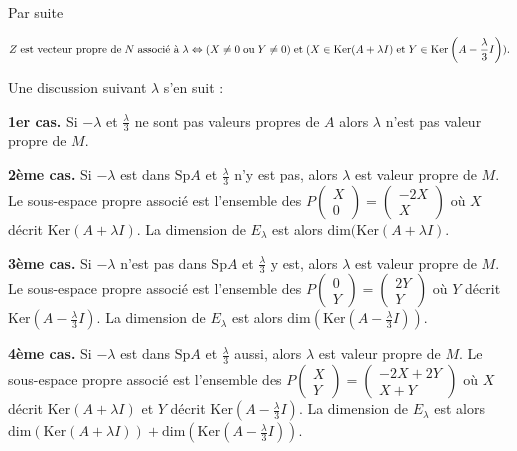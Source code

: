 {{Par suite

\begin{align*}\ensuremath
Z\;\text{est vecteur propre de}\;N\;\text{associé à}\;\lambda\Leftrightarrow(X\neq0\;\text{ou}\;Y\neq0)\;\text{et}\; 
(X\in\text{Ker}(A+\lambda I)\;\text{et}\;Y\in\text{Ker}\left(A-\frac{\lambda}{3}I\right)).
\end{align*}

Une discussion suivant $\lambda$ s'en suit :

\textbf{1er cas.} Si $-\lambda$ et $\frac{\lambda}{3}$ ne sont pas valeurs propres de $A$ alors $\lambda$ n'est pas valeur propre de $M$.

\textbf{2ème cas.} Si $-\lambda$ est dans $\text{Sp}A$ et $\frac{\lambda}{3}$ n'y est pas, alors $\lambda$ est valeur propre de $M$.
Le sous-espace propre associé est l'ensemble des $P\left(
\begin{array}{c}
X\\
0
\end{array}
\right)=\left(
\begin{array}{c}
-2X\\
X
\end{array}
\right)$ où $X$ décrit $\text{Ker}(A+\lambda I)$. La dimension de $E_\lambda$ est alors $\text{dim}(\text{Ker}(A+\lambda I)$.

\textbf{3ème cas.} Si $-\lambda$ n'est pas dans $\text{Sp}A$ et $\frac{\lambda}{3}$ y est, alors $\lambda$ est valeur propre de $M$.
Le sous-espace propre associé est l'ensemble des $P\left(
\begin{array}{c}
0\\
Y
\end{array}
\right)=\left(
\begin{array}{c}
2Y\\
Y
\end{array}
\right)$ où $Y$ décrit $\text{Ker}\left(A-\frac{\lambda}{3}I\right)$. La dimension de $E_\lambda$ est alors $\text{dim}\left(\text{Ker}\left(A-\frac{\lambda}{3}I\right)\right)$.

\textbf{4ème cas.} Si $-\lambda$ est dans $\text{Sp}A$ et $\frac{\lambda}{3}$  aussi, alors $\lambda$ est valeur propre de $M$.
Le sous-espace propre associé est l'ensemble des $P\left(
\begin{array}{c}
X\\
Y
\end{array}
\right)=\left(
\begin{array}{c}
-2X+2Y\\
X+Y
\end{array}
\right)$ où $X$ décrit $\text{Ker}(A+\lambda I)$  et $Y$ décrit $\text{Ker}\left(A-\frac{\lambda}{3}I\right)$. La dimension de $E_\lambda$ est alors $\text{dim}(\text{Ker}(A+\lambda I)) +\text{dim}\left(\text{Ker}\left(A-\frac{\lambda}{3}I\right)\right)$.

}}

